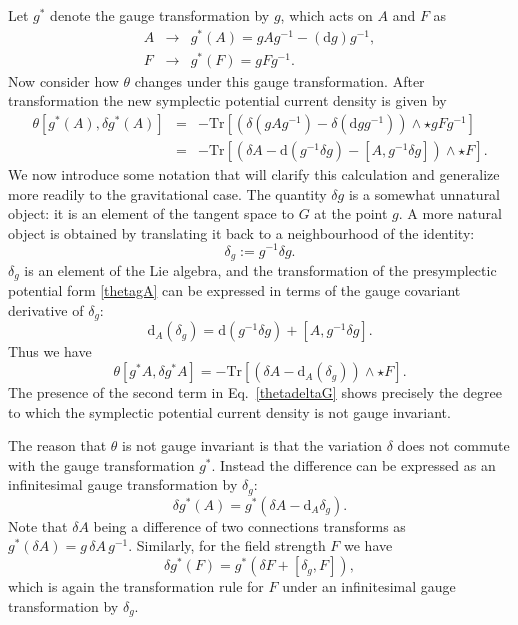 \documentclass[a4paper,11pt]{article}
\newcommand{\be}{\begin{equation}}
\newcommand{\ee}{\end{equation}}
\newcommand{\bea}{\begin{eqnarray}}
\newcommand{\eea}{\end{eqnarray}}
\def\rd{\mathrm{d}}
\newcommand{\Tr}{\mbox{Tr}}
\begin{document}
Let $g^*$ denote the gauge transformation by $g$, which acts on $A$ and $F$ as
\bea
A & \rightarrow & g^*(A) = g A g^{-1} - (\rd g) g^{-1}, \\
F & \rightarrow & g^*(F) = g F g^{-1}.
\eea
Now consider how $\theta$ changes under this gauge transformation.
After transformation the new symplectic potential current density is given by
\bea  
\theta[g^*(A), \delta g^*(A)] &=& -\Tr [ (\delta (g A g^{-1}) - \delta(\rd g g^{-1}))\wedge  \star   g F  g^{-1}] \nonumber \\
&=& -\Tr[  \left(\delta A - \rd (g^{-1} \delta g) - [A, g^{-1}\delta g] \right) \wedge \star F ]. \label{thetagA}
\eea
We now introduce some notation that will clarify this calculation and generalize more readily to the gravitational case.
The quantity $\delta g$ is a somewhat unnatural object: it is an element of the tangent space to $G$ at the point $g$. 
A more natural object is obtained by translating it back to a neighbourhood of the identity:
\begin{equation}
\delta_g := g^{-1} \delta g.
\end{equation}
$\delta_g$ is an element of the Lie algebra, and the transformation of the presymplectic potential form \eqref{thetagA} can be expressed in terms of the gauge covariant derivative of $\delta_g$:
\be
\rd_A(\delta_g) = \rd (g^{-1} \delta g) + [A, g^{-1} \delta g].
\ee
Thus we have
\be \label{thetadeltaG}
\theta[g^* A, \delta g^* A] = -\Tr[ (\delta A - \rd_A (\delta_g) )\wedge \star F  ].
\ee
The presence of the second term in Eq.~\eqref{thetadeltaG} shows precisely the degree to which the symplectic potential current density is not gauge invariant.

The reason that $\theta$ is not gauge invariant is that the variation $\delta$ does not commute with the gauge transformation $g^*$.
Instead the difference can be expressed as an infinitesimal gauge transformation by $\delta_g$:
\begin{equation} \label{deltaGA}
\delta g^* (A) = g^* (\delta A - \rd_A \delta_g ).
\end{equation}
Note that $\delta A$ being a difference of two connections transforms as $g^* (\delta A) = g \, \delta A \, g^{-1}$.
Similarly, for the field strength $F$ we have
\begin{equation} \label{deltaGF}
\delta g^* (F) = g^* (\delta F + [\delta_g, F]),
\end{equation}
which is again the transformation rule for $F$ under an infinitesimal gauge transformation by $\delta_g$.
\end{document}
